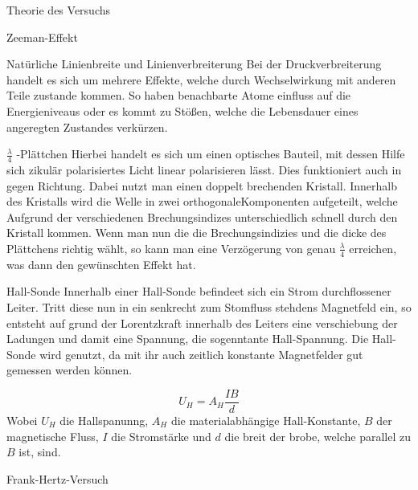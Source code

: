\documentclass[pdftex, a4paper,11pt, twoside, ngerman]{report}
\begin{document}
\begin{chapter}{Theorie des Versuchs}
\begin{section}{Zeeman-Effekt}
\begin{subsection}{Natürliche Linienbreite und Linienverbreiterung}
            Bei der Druckverbreiterung handelt es sich um mehrere Effekte, welche durch Wechselwirkung mit anderen Teile zustande kommen.
            So haben benachbarte Atome einfluss auf die Energieniveaus oder es kommt zu Stößen, welche die Lebensdauer eines angeregten Zustandes verkürzen. 

        \end{subsection}
        \begin{subsection}{$\frac \lambda 4$ -Plättchen}
            Hierbei handelt es sich um einen optisches Bauteil, mit dessen Hilfe sich zikulär polarisiertes Licht linear polarisieren lässt. 
            Dies funktioniert auch in gegen Richtung. Dabei nutzt man einen doppelt brechenden Kristall. 
            Innerhalb des Kristalls wird die Welle in zwei orthogonaleKomponenten aufgeteilt, welche Aufgrund der verschiedenen Brechungsindizes unterschiedlich schnell durch den Kristall kommen.
            Wenn man nun die die Brechungsindizies und die dicke des Plättchens richtig wählt, so kann man eine Verzögerung von genau $\frac \lambda 4$ erreichen, was dann den gewünschten Effekt hat.

        \end{subsection}
        \begin{subsection}{Hall-Sonde}
            Innerhalb einer Hall-Sonde befindeet sich ein Strom durchflossener Leiter. 
            Tritt diese nun in ein senkrecht zum Stomfluss stehdens Magnetfeld ein, so entsteht auf grund der Lorentzkraft innerhalb des Leiters eine verschiebung der Ladungen und damit eine Spannung, die sogenntante Hall-Spannung.
            Die Hall-Sonde wird genutzt, da mit ihr auch zeitlich konstante Magnetfelder gut gemessen werden können.
            
            \[
                U_H = A_H\frac{IB}{d}
            \]
            Wobei $U_H$ die Hallspanunng, $A_H$ die materialabhängige Hall-Konstante, $B$ der magnetische Fluss, $I$ die Stromstärke und $d$ die breit der brobe, welche parallel zu $B$ ist, sind.

        \end{subsection}
    \end{section}

    \begin{section}{Frank-Hertz-Versuch}


\end{section}
\end{chapter}
\end{document}
